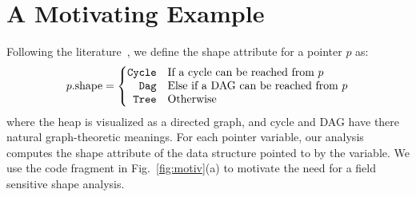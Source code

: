 \documentclass{sig-alternate}
\newcommand{\p}{\ensuremath{p}}
\newcommand{\shape}{\mbox{shape}}
\newcommand{\Tree}{{\tt Tree}}
\newcommand{\Dag}{{\tt Dag}}
\newcommand{\Cycle}{{\tt Cycle}}
\begin{document}
\section{A Motivating Example}\label{sec:motiv}

Following the
literature~\cite{Ghiya96,Sagiv96,marron06static},
we define the shape attribute for a pointer $\p$
as:
\begin{eqnarray*}
  \p.\shape = \left\{ \begin{array}{@{}rl@{}}
    \Cycle & \mbox{If a cycle can be reached from $\p$} \\ 
    \Dag & \mbox{Else if a DAG can be reached from $\p$} \\
    \Tree & \mbox{Otherwise} \\
  \end{array} \right.
\end{eqnarray*}
where the heap is visualized as a directed graph, and cycle
and DAG have there natural graph-theoretic meanings. For each
pointer variable, our analysis computes the shape attribute
of the data structure pointed to by the variable.  We use the
code fragment in Fig.~\ref{fig:motiv}(a) to motivate the need
for a field sensitive shape analysis.
\end{document}
